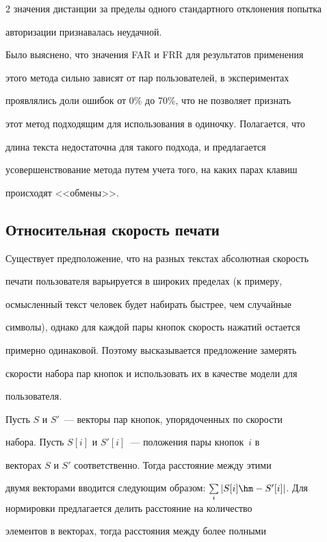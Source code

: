\begin{multicols}{2}
значения дистанции за пределы одного стандартного отклонения попытка

авторизации признавалась неудачной.



Было выяснено, что значения FAR и FRR для результатов применения

этого метода сильно зависят от пар пользователей, в экспериментах

проявлялись доли ошибок от 0\% до 70\%, что не позволяет признать

этот метод подходящим для использования в одиночку. Полагается, что

длина текста недостаточна для такого подхода, и предлагается

усовершенствование метода путем учета того, на каких парах клавиш

происходят <<обмены>>.



\subsection{Относительная скорость печати}



Существует предположение, что на разных текстах абсолютная скорость

печати пользователя варь\-и\-ру\-ет\-ся в широких пределах (к примеру,

осмыс\-лен\-ный текст человек будет набирать быстрее, чем случайные

символы), однако для каждой пары кнопок скорость нажатий остается

примерно одинаковой. Поэтому высказывается предложение замерять

скорости набора пар кнопок и использовать их в качестве модели для

пользователя.



Пусть $S$ и $S'$~--- векторы пар кнопок, упорядоченных по скорости

набора. Пусть $S[i]$ и $S'[i]$~--- положения пары кнопок~$i$ в

векторах $S$ и $S'$ соответственно. Тогда расстояние между этими

двумя векторами вводится следующим образом: $\sum\limits_i |S[i] \hm-

S'[i]|$. Для нормировки предлагается делить расстояние на количество

элементов в векторах, тогда расстояния между более полными


\end{multicols}
